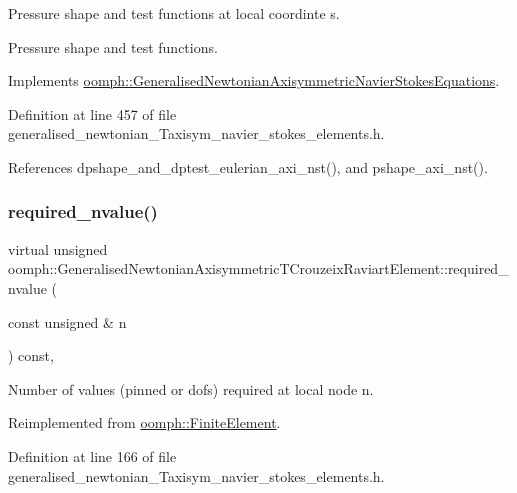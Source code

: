 Pressure shape and test functions at local coordinte s. 

Pressure shape and test functions. 

Implements \hyperlink{classoomph_1_1GeneralisedNewtonianAxisymmetricNavierStokesEquations_a278087089b3cd5b354b57b997ce7a224}{oomph\+::\+Generalised\+Newtonian\+Axisymmetric\+Navier\+Stokes\+Equations}.



Definition at line 457 of file generalised\+\_\+newtonian\+\_\+\+Taxisym\+\_\+navier\+\_\+stokes\+\_\+elements.\+h.



References dpshape\+\_\+and\+\_\+dptest\+\_\+eulerian\+\_\+axi\+\_\+nst(), and pshape\+\_\+axi\+\_\+nst().

\mbox{\label{classoomph_1_1GeneralisedNewtonianAxisymmetricTCrouzeixRaviartElement_a78a4865b53c8752ae2ac7700f29ea6a5}} 
\subsubsection{\texorpdfstring{required\+\_\+nvalue()}{required\_nvalue()}}
{\footnotesize\ttfamily virtual unsigned oomph\+::\+Generalised\+Newtonian\+Axisymmetric\+T\+Crouzeix\+Raviart\+Element\+::required\+\_\+nvalue (\begin{DoxyParamCaption}\item[{const unsigned \&}]{n }\end{DoxyParamCaption}) const\hspace{0.3cm}{\ttfamily [inline]}, {\ttfamily [virtual]}}



Number of values (pinned or dofs) required at local node n. 



Reimplemented from \hyperlink{classoomph_1_1FiniteElement_a56610c60d5bc2d7c27407a1455471b1a}{oomph\+::\+Finite\+Element}.



Definition at line 166 of file generalised\+\_\+newtonian\+\_\+\+Taxisym\+\_\+navier\+\_\+stokes\+\_\+elements.\+h.



